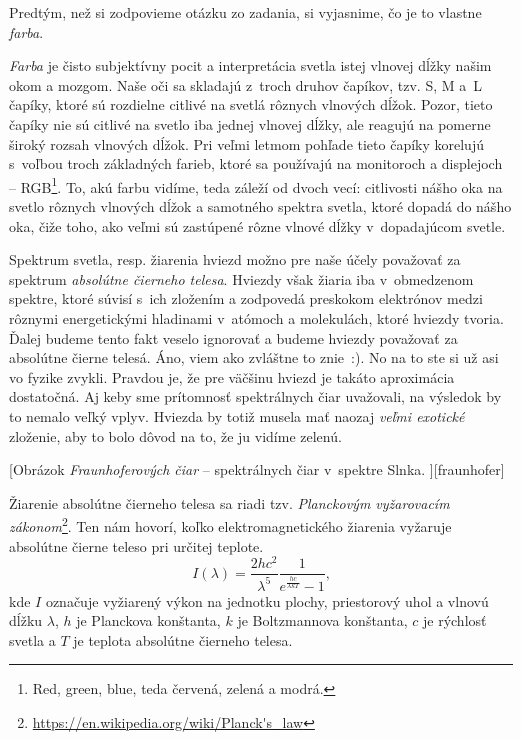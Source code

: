 Predtým, než si zodpovieme otázku zo zadania, si vyjasnime, čo je to vlastne \emph{farba}. 

\emph{Farba} je čisto subjektívny pocit a interpretácia svetla istej vlnovej dĺžky našim okom a mozgom.
Naše oči sa skladajú z~troch druhov čapíkov, tzv. S, M a~L čapíky, ktoré sú rozdielne citlivé na svetlá rôznych vlnových dĺžok.
Pozor, tieto čapíky nie sú citlivé na svetlo iba jednej vlnovej dĺžky, ale reagujú na pomerne široký rozsah vlnových dĺžok.
Pri veľmi letmom pohľade tieto čapíky korelujú s~voľbou troch základných farieb, ktoré sa používajú na monitoroch a displejoch -- RGB\footnote{Red, green, blue, teda červená, zelená a modrá.}.
To, akú farbu vidíme, teda záleží od dvoch vecí: citlivosti nášho oka na svetlo rôznych vlnových dĺžok a samotného spektra svetla,
ktoré dopadá do nášho oka, čiže toho, ako veľmi sú zastúpené rôzne vlnové dĺžky v~dopadajúcom svetle.

Spektrum svetla, resp. žiarenia hviezd možno pre naše účely považovať za spektrum \emph{absolútne čierneho telesa}.
Hviezdy však žiaria iba v~obmedzenom spektre, ktoré súvisí s~ich zložením a zodpovedá preskokom 
elektrónov medzi rôznymi energetickými hladinami v~atómoch a molekulách, ktoré hviezdy tvoria.
Ďalej budeme tento fakt veselo ignorovať a budeme hviezdy považovať za absolútne čierne telesá. Áno, viem ako zvláštne to znie~:). No na to ste si už asi vo fyzike zvykli.
Pravdou je, že pre väčšinu hviezd je takáto aproximácia dostatočná.
Aj keby sme prítomnosť spektrálnych čiar uvažovali, na výsledok by to nemalo veľký vplyv.
Hviezda by totiž musela mať naozaj \emph{veľmi exotické} zloženie, aby to bolo dôvod na to, že ju vidíme zelenú. 

[Obrázok \emph{Fraunhoferových čiar} -- spektrálnych čiar v~spektre Slnka.%
][fraunhofer]

Žiarenie absolútne čierneho telesa sa riadi tzv. \emph{Planckovým vyžarovacím zákonom}\footnote{\url{https://en.wikipedia.org/wiki/Planck's_law}}.
Ten nám hovorí, koľko elektromagnetického žiarenia vyžaruje absolútne čierne teleso pri určitej teplote. 
$$
I(\lambda) = \frac{2hc^2}{\lambda^5}\frac{1}{e^{\frac{hc}{\lambda k T}}-1}\text{,}
$$
kde $I$ označuje vyžiarený výkon na jednotku plochy, priestorový uhol a vlnovú dĺžku $\lambda$, $h$ je Planckova konštanta, $k$ je Boltzmannova konštanta, $c$ je rýchlosť svetla a $T$ je teplota absolútne čierneho telesa.

